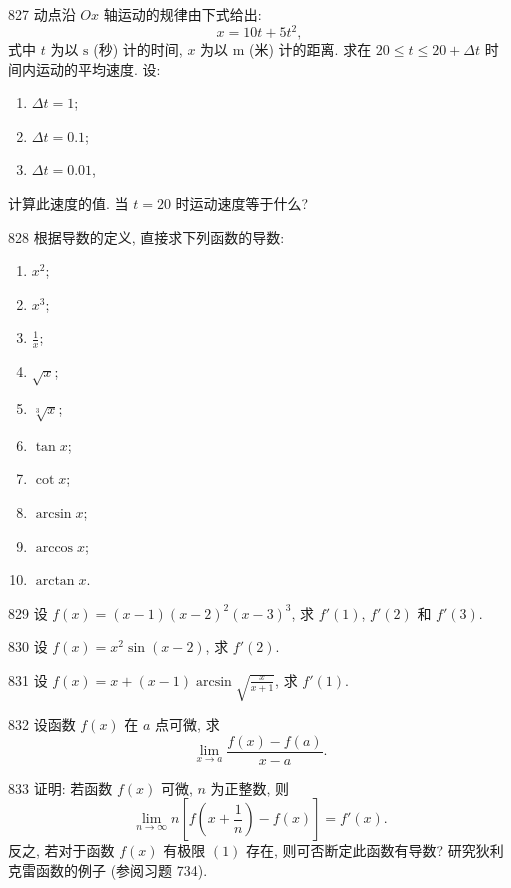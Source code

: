 \begin{prob}[L]{827}
动点沿 $Ox$ 轴运动的规律由下式给出:
\[
x = 10t + 5t^2,
\]
式中 $t$ 为以 $\mathrm{s}$ (秒) 计的时间, $x$ 为以 $\mathrm{m}$ (米) 计的距离. 求在 $20 \leqslant t \leqslant 20 + \Delta t$ 时间内运动的平均速度. 设:
\begin{enumerate}[label=(\alph*), itemsep=2pt, topsep=3pt]
\item $\Delta t = 1$;
\item $\Delta t = 0.1$;
\item $\Delta t = 0.01$,
\end{enumerate}
计算此速度的值. 当 $t = 20$ 时运动速度等于什么?
\end{prob}

\begin{prob}[L]{828}
根据导数的定义, 直接求下列函数的导数:
\begin{enumerate}[label=(\alph*), itemsep=2pt, topsep=3pt]
\item $x^2$;
\item $x^3$;
\item $\frac{1}{x}$;
\item $\sqrt{x}$;
\item $\sqrt[3]{x}$;
\item $\tan x$;
\item $\cot x$;
\item $\arcsin x$;
\item $\arccos x$;
\item $\arctan x$.
\end{enumerate}
\end{prob}

\begin{prob}[M]{829}
设 $f(x) = (x - 1)(x - 2)^2(x - 3)^3$, 求 $f'(1)$, $f'(2)$ 和 $f'(3)$.
\end{prob}

\begin{prob}[S]{830}
设 $f(x) = x^2\sin(x - 2)$, 求 $f'(2)$.
\end{prob}

\begin{prob}[M]{831}
设 $f(x) = x + (x - 1)\arcsin\sqrt{\frac{x}{x + 1}}$, 求 $f'(1)$.
\end{prob}

\begin{prob}[M]{832}
设函数 $f(x)$ 在 $a$ 点可微, 求
\[
\lim_{x \to a} \frac{f(x) - f(a)}{x - a}.
\]
\end{prob}

\begin{prob}[L]{833}
证明: 若函数 $f(x)$ 可微, $n$ 为正整数, 则
\[
\lim_{n \to \infty} n\left[ f\left(x + \frac{1}{n}\right) - f(x) \right] = f'(x). \tag{1}
\]
反之, 若对于函数 $f(x)$ 有极限 $(1)$ 存在, 则可否断定此函数有导数? 研究狄利克雷函数的例子 (参阅习题 734).
\end{prob}

